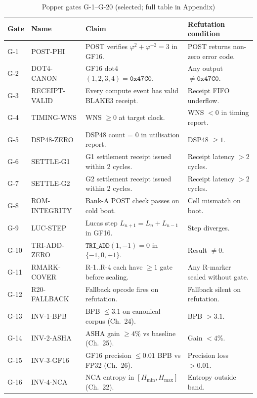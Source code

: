 \begin{table}[H]
\centering
\caption{Popper gates G-1--G-20 (selected; full table in Appendix)}
\label{tab74:gates-selected}
\small
\begin{tabular}{llp{4.5cm}p{3.5cm}}
\toprule
Gate & Name & Claim & Refutation condition \\
\midrule
G-1  & POST-PHI      & POST verifies $\varphi^2+\varphi^{-2}=3$ in GF16. & POST returns non-zero error code. \\
G-2  & DOT4-CANON    & GF16 dot4$(1,2,3,4)=\mathtt{0x47C0}$.            & Any output $\neq\mathtt{0x47C0}$.  \\
G-3  & RECEIPT-VALID & Every compute event has valid BLAKE3 receipt.     & Receipt FIFO underflow. \\
G-4  & TIMING-WNS    & WNS $\geq 0$ at target clock.                    & WNS $< 0$ in timing report.  \\
G-5  & DSP48-ZERO    & DSP48 count = 0 in utilisation report.            & DSP48 $\geq 1$.  \\
G-6  & SETTLE-G1     & G1 settlement receipt issued within 2 cycles.     & Receipt latency $> 2$ cycles.  \\
G-7  & SETTLE-G2     & G2 settlement receipt issued within 2 cycles.     & Receipt latency $> 2$ cycles.  \\
G-8  & ROM-INTEGRITY & Bank-A POST check passes on cold boot.            & Cell mismatch on boot.  \\
G-9  & LUC-STEP      & Lucas step $L_{n+1} = L_n + L_{n-1}$ in GF16.   & Step diverges. \\
G-10 & TRI-ADD-ZERO  & $\mathtt{TRI\_ADD}(1,-1)=0$ in $\{-1,0,+1\}$.   & Result $\neq 0$.  \\
G-11 & RMARK-COVER   & R-1..R-4 each have $\geq 1$ gate before sealing. & Any R-marker sealed without gate.  \\
G-12 & R20-FALLBACK  & Fallback opcode fires on refutation.              & Fallback silent on refutation. \\
G-13 & INV-1-BPB     & BPB $\leq 3.1$ on canonical corpus (Ch.~24).     & BPB $> 3.1$. \\
G-14 & INV-2-ASHA    & ASHA gain $\geq 4\%$ vs baseline (Ch.~25).       & Gain $< 4\%$. \\
G-15 & INV-3-GF16    & GF16 precision $\leq 0.01$ BPB vs FP32 (Ch.~26). & Precision loss $> 0.01$.  \\
G-16 & INV-4-NCA     & NCA entropy in $[H_{\min},H_{\max}]$ (Ch.~22).   & Entropy outside band. \\

\end{tabular}
\end{table}
